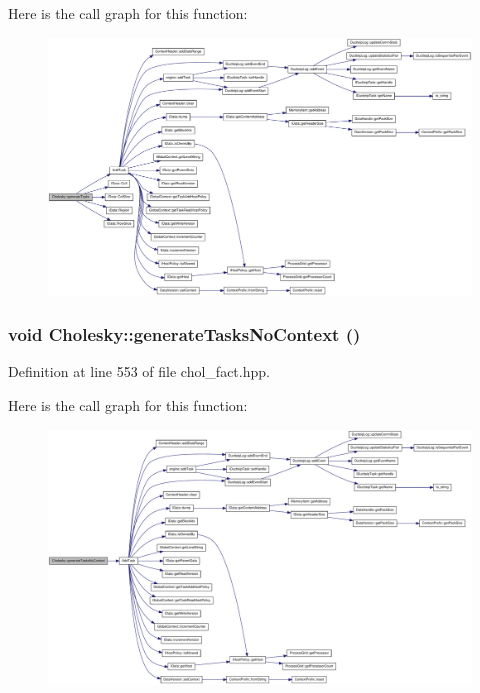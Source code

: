Here is the call graph for this function:\nopagebreak
\begin{figure}[H]
\begin{center}
\leavevmode
\includegraphics[width=420pt]{class_cholesky_adadbc20c3a9481c909c8143985fbf0e1_cgraph}
\end{center}
\end{figure}
\hypertarget{class_cholesky_a718109d74c3316742c6accccdb010a92}{
\subsubsection[{generateTasksNoContext}]{\setlength{\rightskip}{0pt plus 5cm}void Cholesky::generateTasksNoContext ()}}
\label{class_cholesky_a718109d74c3316742c6accccdb010a92}


Definition at line 553 of file chol\_\-fact.hpp.

Here is the call graph for this function:\nopagebreak
\begin{figure}[H]
\begin{center}
\leavevmode
\includegraphics[width=420pt]{class_cholesky_a718109d74c3316742c6accccdb010a92_cgraph}
\end{center}
\end{figure}



